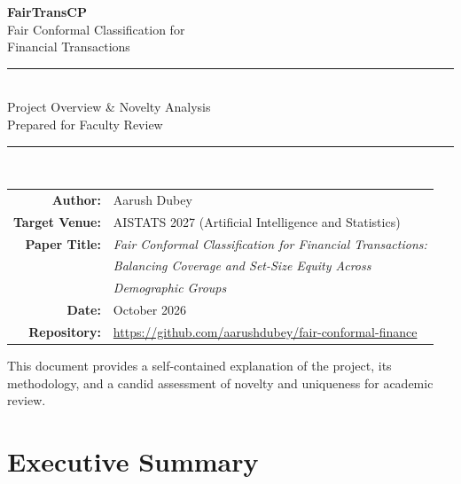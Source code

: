 \documentclass[11pt,a4paper]{article}
\begin{document}
\begin{titlepage}
\centering
\vspace*{2cm}

{\Huge\bfseries\color{sectioncolor} FairTransCP}\\[0.6cm]
{\LARGE\color{accentblue} Fair Conformal Classification for\\Financial Transactions}\\[1.5cm]

\rule{0.7\textwidth}{1pt}\\[0.8cm]

{\Large Project Overview \& Novelty Analysis}\\[0.4cm]
{\large Prepared for Faculty Review}\\[1.5cm]

\rule{0.7\textwidth}{0.4pt}\\[0.8cm]

\begin{tabular}{rl}
\textbf{Author:} & Aarush Dubey \\[4pt]
\textbf{Target Venue:} & AISTATS 2027 (Artificial Intelligence and Statistics) \\[4pt]
\textbf{Paper Title:} & \emph{Fair Conformal Classification for Financial Transactions:} \\
& \emph{Balancing Coverage and Set-Size Equity Across} \\
& \emph{Demographic Groups} \\[4pt]
\textbf{Date:} & October 2026 \\[4pt]
\textbf{Repository:} & \url{https://github.com/aarushdubey/fair-conformal-finance}
\end{tabular}

\vfill

{\small This document provides a self-contained explanation of the project, its methodology, and a candid assessment of novelty and uniqueness for academic review.}
\end{titlepage}

\tableofcontents
\newpage

\section{Executive Summary}
\label{sec:summary}
\end{document}

